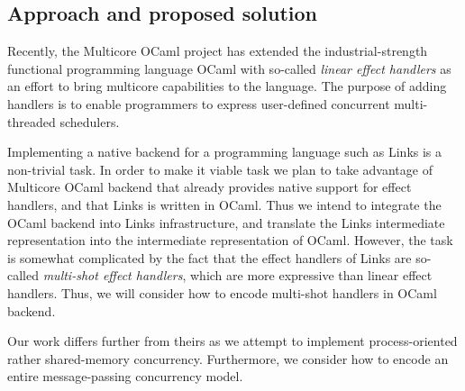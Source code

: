 \documentclass[12pt,mscres,cdtppar,twoside,openright,logo,rightchapter,normalheadings]{infthesis}
\theoremstyle{definition}
\newcommand{\todo}[1]{{\par\noindent\small\color{red} \framebox{\parbox{\dimexpr\linewidth-2\fboxsep-2\fboxrule}{\textbf{TODO:} #1}}}}
\begin{document}
\subsection{Approach and proposed solution}

Recently, the Multicore OCaml project \citep{Dolan2015} has extended
the industrial-strength functional programming language OCaml with
so-called \emph{linear effect handlers} as an effort to bring
multicore capabilities to the language. The purpose of adding handlers
is to enable programmers to express user-defined concurrent
multi-threaded schedulers.

Implementing a native backend for a programming language such as Links
is a non-trivial task. In order to make it viable task we plan to take
advantage of Multicore OCaml backend that already provides native
support for effect handlers, and that Links is written in OCaml. Thus
we intend to integrate the OCaml backend into Links infrastructure,
and translate the Links intermediate representation into the
intermediate representation of OCaml. However, the task is somewhat
complicated by the fact that the effect handlers of Links are
so-called \emph{multi-shot effect handlers}, which are more expressive
than linear effect handlers. Thus, we will consider how to encode
multi-shot handlers in OCaml backend.

Our work differs further from theirs as we attempt to implement
process-oriented rather shared-memory concurrency. Furthermore, we
consider how to encode an entire message-passing concurrency model.



\end{document}
